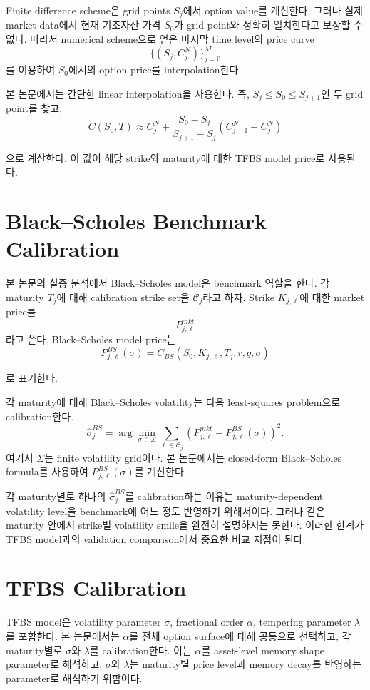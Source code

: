 \documentclass[11pt,a4paper]{report}
\begin{document}
Finite difference scheme은 grid points $S_j$에서 option value를 계산한다. 그러나 실제 market data에서 현재 기초자산 가격 $S_0$가 grid point와 정확히 일치한다고 보장할 수 없다. 따라서 numerical scheme으로 얻은 마지막 time level의 price curve
\[
\{(S_j,C_j^N)\}_{j=0}^{M}
\]
를 이용하여 $S_0$에서의 option price를 interpolation한다.

본 논문에서는 간단한 linear interpolation을 사용한다. 즉, $S_j\le S_0\le S_{j+1}$인 두 grid point를 찾고,
\[
C(S_0,T)
\approx
C_j^N
+
\frac{S_0-S_j}{S_{j+1}-S_j}
\left(
C_{j+1}^N-C_j^N
\right)
\]

으로 계산한다. 이 값이 해당 strike와 maturity에 대한 TFBS model price로 사용된다.

\section{Black--Scholes Benchmark Calibration}

본 논문의 실증 분석에서 Black--Scholes model은 benchmark 역할을 한다. 각 maturity $T_j$에 대해 calibration strike set을 $\mathcal{C}_j$라고 하자. Strike $K_{j,\ell}$에 대한 market price를
\[
P_{j,\ell}^{mkt}
\]
라고 쓴다. Black--Scholes model price는
\[
P_{j,\ell}^{BS}(\sigma)
=
C_{BS}(S_0,K_{j,\ell},T_j,r,q,\sigma)
\]

로 표기한다.

각 maturity에 대해 Black--Scholes volatility는 다음 least-squares problem으로 calibration한다.
\[
\widehat{\sigma}_j^{BS}
=
\arg\min_{\sigma\in\Sigma}
\sum_{\ell\in\mathcal{C}_j}
\left(
P_{j,\ell}^{mkt}
-
P_{j,\ell}^{BS}(\sigma)
\right)^2.
\]
여기서 $\Sigma$는 finite volatility grid이다. 본 논문에서는 closed-form Black--Scholes formula를 사용하여 $P_{j,\ell}^{BS}(\sigma)$를 계산한다.

각 maturity별로 하나의 $\widehat{\sigma}_j^{BS}$를 calibration하는 이유는 maturity-dependent volatility level을 benchmark에 어느 정도 반영하기 위해서이다. 그러나 같은 maturity 안에서 strike별 volatility smile을 완전히 설명하지는 못한다. 이러한 한계가 TFBS model과의 validation comparison에서 중요한 비교 지점이 된다.

\section{TFBS Calibration}

TFBS model은 volatility parameter $\sigma$, fractional order $\alpha$, tempering parameter $\lambda$를 포함한다. 본 논문에서는 $\alpha$를 전체 option surface에 대해 공통으로 선택하고, 각 maturity별로 $\sigma$와 $\lambda$를 calibration한다. 이는 $\alpha$를 asset-level memory shape parameter로 해석하고, $\sigma$와 $\lambda$는 maturity별 price level과 memory decay를 반영하는 parameter로 해석하기 위함이다.
\end{document}
